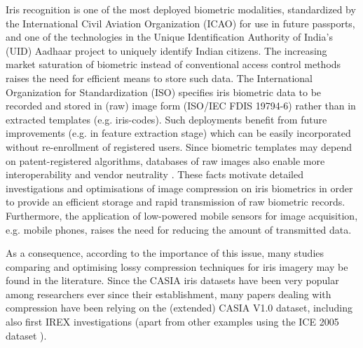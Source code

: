 \documentclass[10pt,twocolumn,letterpaper]{article}
\begin{document}
Iris recognition \cite{BBurge13a,Rathgeb12e} is one of the most deployed biometric
modalities, standardized by the International Civil Aviation
Organization (ICAO) for use in future passports, and one of
the technologies in the Unique Identification Authority of
India's (UID) Aadhaar project to uniquely identify Indian
citizens. The increasing market saturation of
biometric instead of conventional access control methods
raises the need for efficient means to store such data. The
International Organization for Standardization (ISO)
specifies iris biometric data to be recorded and stored in (raw)
image form (ISO/IEC FDIS 19794-6) rather than in extracted
templates (e.g. iris-codes). Such
deployments benefit from future improvements (e.g. in
feature extraction stage) which can be easily incorporated
without re-enrollment of registered users. Since biometric templates may depend on patent-registered
algorithms, databases of raw images also enable more
interoperability and vendor neutrality \cite{Rathgeb12e}. These facts
motivate detailed investigations and optimisations of image
compression on iris biometrics in order to provide an efficient
storage and rapid transmission of raw biometric records.
Furthermore, the application of low-powered mobile sensors
for image acquisition, e.g. mobile phones, raises the need for
reducing the amount of transmitted data.


As a consequence, according to the importance of this issue, many studies comparing and optimising lossy compression techniques for iris imagery 
may be found in the literature. Since the CASIA iris datasets have been very popular among researchers ever since their establishment,
many papers dealing with compression have been relying on the (extended) CASIA V1.0 dataset, including also first IREX investigations 
\cite{BRakshit07a,BIves08a,Matschitsch07a,Haemmerle09a,Konrad09a} (apart from other examples using the ICE 2005 dataset 
\cite{BDaugman08a,BIves10a}).
	
\end{document}

